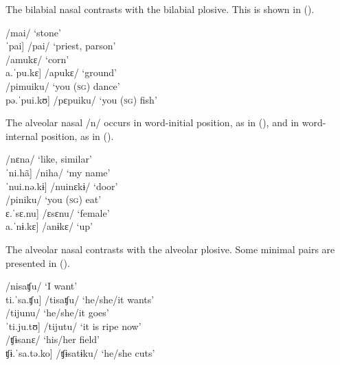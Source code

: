  The bilabial nasal contrasts with the bilabial plosive. This is shown in ().

\ea\label{ex:m-p}
\ea   \tab[ˈmai] \tab /mai/ \tab\tab ‘stone’\\
     \tab{[}ˈpai] \tab\tab /pai/ \tab\tab ‘priest, parson’\\
\ex  \tab[a.ˈmu.kɛ] \tab /amukɛ/ \tab ‘corn’\\
    \tab{[}a.ˈpu.kɛ] \tab /apukɛ/ \tab ‘ground’\\
\ex  \tab[pi.ˈmui.kʊ] \tab /pimuiku/ \tab ‘you (\textsc{sg}) dance’\\
    \tab{[}pǝ.ˈpui.kʊ] \tab /pɛpuiku/ \tab ‘you (\textsc{sg}) fish’\\%
\z
\xe
 
The alveolar nasal /n/ occurs in word-initial position, as in (), and in word-internal position, as in ().

\ea\label{ex:n}
\ea\label{ex:n.1}     \tab[ˈnɛ.na] \tab  /nɛna/ \tab  ‘like, similar’\\
     \tab{[}ˈni.hã] \tab /niha/ \tab ‘my name’\\
     \tab{[}ˈnui.nə.kɨ] \tab /nuinɛkɨ/ \tab ‘door’\\
\ex\label{ex:n.2}      \tab[pi.ˈni.ku] \tab  /piniku/ \tab  ‘you (\textsc{sg}) eat’\\
      \tab{[}ɛ.ˈsɛ.nu] \tab /ɛsɛnu/ \tab ‘female’ \\
     \tab{[}a.ˈnɨ.kɛ] \tab /anɨkɛ/ \tab ‘up’\\ %
\z
\xe 
    
The alveolar nasal contrasts with the alveolar plosive. Some minimal pairs are presented in ().

\ea\label{ex:n-t}
\ea    \tab[ni.ˈsa.ʧu] \tab /nisaʧu/ \tab ‘I want’\\
     \tab{[}ti.ˈsa.ʧu] \tab /tisaʧu/ \tab ‘he/she/it wants’\\
\ex     \tab[ti.ˈju.nʊ] \tab /tijunu/ \tab ‘he/she/it goes’\\
     \tab{[}ˈti.ju.tʊ] \tab /tijutu/ \tab ‘it is ripe now’\\
\ex     \tab[ʧɨ.ˈsa.nɛ] \tab /ʧɨsanɛ/ \tab ‘his/her field’\\
     \tab{[}ʧɨ.ˈsa.tə.ko] \tab /ʧɨsatɨku/ \tab ‘he/she cuts’\\%
\z
\xe

